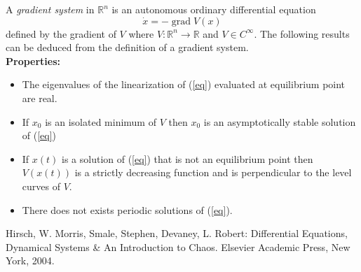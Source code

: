 \documentclass[12pt]{article}
\begin{document}

A \emph{gradient system} in $\mathbb{R}^n$ is an autonomous ordinary differential equation
\begin{equation}
\dot{x}=-\operatorname{grad}V(x)\label{eq}
\end{equation}
defined by the gradient of $V$ where $V:\mathbb{R}^n\to \mathbb{R}$ and $V\in C^\infty$.  The following results can be deduced from the definition of a gradient system.\\
\textbf{Properties:}
\begin{itemize}
\item The eigenvalues of the linearization of (\ref{eq}) evaluated at equilibrium point are real.
\item If $x_0$ is an isolated minimum of $V$ then $x_0$ is an asymptotically stable solution of (\ref{eq})
\item If $x(t)$ is a solution of (\ref{eq}) that is not an equilibrium point then $V(x(t))$ is a strictly decreasing function and is perpendicular to the level curves of $V$.
\item There does not exists periodic solutions of (\ref{eq}).
\end{itemize}

\begin{thebibliography}{1}
 Hirsch, W. Morris, Smale, Stephen, Devaney, L. Robert: Differential Equations, Dynamical Systems \& An Introduction to Chaos. Elsevier Academic Press, New York, 2004.
\end{thebibliography}
\end{document}
